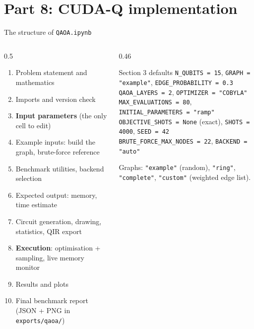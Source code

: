 \documentclass[aspectratio=169,11pt]{beamer}
\newcommand{\key}[1]{{\color{qdark}\textbf{#1}}}
\begin{document}
\section{Part 8: CUDA-Q implementation}
\begin{frame}{The structure of \texttt{QAOA.ipynb}}
  \begin{columns}[T]
    \begin{column}{0.5\textwidth}
      \footnotesize
      \begin{enumerate}\itemsep0pt
        \item Problem statement and mathematics
        \item Imports and version check
        \item \key{Input parameters} (the only cell to edit)
        \item Example inputs: build the graph, brute-force reference
        \item Benchmark utilities, backend selection
        \item Expected output: memory, time estimate
        \item Circuit generation, drawing, statistics, QIR export
        \item \key{Execution}: optimisation + sampling, live memory monitor
        \item Results and plots
        \item Final benchmark report (JSON + PNG in \texttt{exports/qaoa/})
      \end{enumerate}
    \end{column}
    \begin{column}{0.46\textwidth}
      \begin{block}{Section 3 defaults}
        \small
        \texttt{N\_QUBITS = 15}, \texttt{GRAPH = "example"}, \texttt{EDGE\_PROBABILITY = 0.3}\\
        \texttt{QAOA\_LAYERS = 2}, \texttt{OPTIMIZER = "COBYLA"}\\
        \texttt{MAX\_EVALUATIONS = 80}, \texttt{INITIAL\_PARAMETERS = "ramp"}\\
        \texttt{OBJECTIVE\_SHOTS = None} (exact), \texttt{SHOTS = 4000}, \texttt{SEED = 42}\\
        \texttt{BRUTE\_FORCE\_MAX\_NODES = 22}, \texttt{BACKEND = "auto"}
      \end{block}
      \small Graphs: \texttt{"example"} (random), \texttt{"ring"}, \texttt{"complete"}, \texttt{"custom"} (weighted edge list).
    \end{column}
  \end{columns}
\end{frame}
\end{document}
